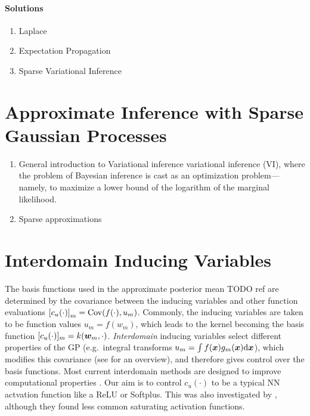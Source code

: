 \paragraph{Solutions}
\begin{enumerate}
  \item Laplace
  \item Expectation Propagation
  \item Sparse Variational Inference
\end{enumerate}


\section{Approximate Inference with Sparse Gaussian Processes}

\begin{enumerate}
  \item General introduction to Variational inference \citep{blei2017variational}
variational inference (VI), where the problem of Bayesian inference is cast as an optimization problem—namely, to maximize a lower bound of the logarithm of the marginal likelihood.
  \item Sparse approximations \citep{Snelson05,quinonero2005unifying}
\end{enumerate}

\section{Interdomain Inducing Variables}

The basis functions used in the approximate posterior mean TODO ref are determined by the covariance between the inducing variables and other function evaluations $\left[c_u(\cdot)\right]_m = \Cov(f(\cdot), u_m)$. Commonly, the inducing variables are taken to be function values $u_{m} = f(w_m)$, which leads to the kernel becoming the basis function $[c_u(\cdot)]_{m} = k(\bm{w}_m, \cdot)$. \emph{Interdomain} inducing variables \citep{lazaro2009inter} select different properties of the GP (e.g.~integral transforms $u_m = \int f(\bm{x}) g_m(\bm{x})\mathrm{d}{\bm{x}}$), which modifies this covariance (see \citep{van2020framework,Leibfried2020Tutorial} for an overview), and therefore gives control over the basis functions.
Most current interdomain methods are designed to improve computational properties \citep{hensman2017variational,burt2020variational,Dutordoir2020spherical}. Our aim is to control $c_u(\cdot)$ to be a typical NN actvation function like a ReLU or Softplus. This was also investigated by \citet{sun2021neural}, although they found less common saturating activation functions.

